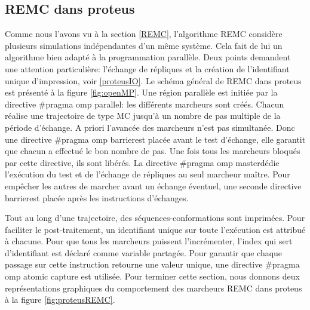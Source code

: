 \subsection{REMC dans proteus}

Comme nous l'avons vu à la section \ref{REMC}, l'algorithme REMC considère plusieurs simulations indépendantes d'un même système. Cela fait de lui un algorithme bien adapté à la programmation parallèle. Deux points demandent une attention particulière: l'échange de répliques et la création de l'identifiant unique d'impression, voir \ref{proteusIO}. Le schéma général de REMC dans proteus est présenté à la figure \ref{fig:openMP}. Une région parallèle est initiée par la directive \og #pragma omp parallel\fg: les différents marcheurs sont créés. Chacun réalise une trajectoire de type MC jusqu'à un nombre de pas multiple de la période d'échange. A priori l'avancée des marcheurs n'est pas simultanée. Donc une directive \og #pragma omp barrier\fg est placée avant le test d'échange, elle garantit que chacun a effectué le bon nombre de pas. Une fois tous les marcheurs bloqués par cette directive, ils sont libérés. La directive \og #pragma omp master\fg dédie l'exécution du test et de l'échange de répliques au seul marcheur maître. Pour empêcher les autres de marcher avant un échange éventuel, une seconde directive \og barrier\fg est placée après les instructions d'échanges.

Tout au long d'une trajectoire, des séquences-conformations sont imprimées. Pour faciliter le post-traitement, un identifiant unique sur toute l'exécution est attribué à chacune. Pour que tous les marcheurs puissent l'incrémenter, l'index qui sert d'identifiant est déclaré comme variable partagée. Pour garantir que chaque passage sur cette instruction retourne une valeur unique, une directive \og#pragma omp atomic capture \fg est utilisée. Pour terminer cette section, nous donnons deux représentations graphiques du comportement des marcheurs REMC dans proteus à la figure \ref{fig:proteusREMC}.  


